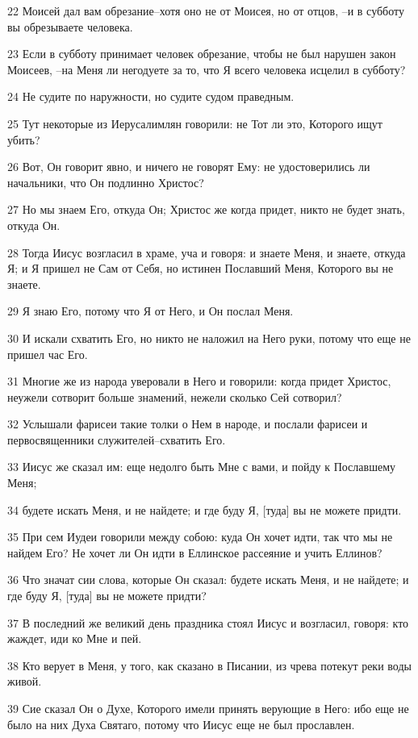 \par 22 Моисей дал вам обрезание--хотя оно не от Моисея, но от отцов, --и в субботу вы обрезываете человека.
\par 23 Если в субботу принимает человек обрезание, чтобы не был нарушен закон Моисеев, --на Меня ли негодуете за то, что Я всего человека исцелил в субботу?
\par 24 Не судите по наружности, но судите судом праведным.
\par 25 Тут некоторые из Иерусалимлян говорили: не Тот ли это, Которого ищут убить?
\par 26 Вот, Он говорит явно, и ничего не говорят Ему: не удостоверились ли начальники, что Он подлинно Христос?
\par 27 Но мы знаем Его, откуда Он; Христос же когда придет, никто не будет знать, откуда Он.
\par 28 Тогда Иисус возгласил в храме, уча и говоря: и знаете Меня, и знаете, откуда Я; и Я пришел не Сам от Себя, но истинен Пославший Меня, Которого вы не знаете.
\par 29 Я знаю Его, потому что Я от Него, и Он послал Меня.
\par 30 И искали схватить Его, но никто не наложил на Него руки, потому что еще не пришел час Его.
\par 31 Многие же из народа уверовали в Него и говорили: когда придет Христос, неужели сотворит больше знамений, нежели сколько Сей сотворил?
\par 32 Услышали фарисеи такие толки о Нем в народе, и послали фарисеи и первосвященники служителей--схватить Его.
\par 33 Иисус же сказал им: еще недолго быть Мне с вами, и пойду к Пославшему Меня;
\par 34 будете искать Меня, и не найдете; и где буду Я, [туда] вы не можете придти.
\par 35 При сем Иудеи говорили между собою: куда Он хочет идти, так что мы не найдем Его? Не хочет ли Он идти в Еллинское рассеяние и учить Еллинов?
\par 36 Что значат сии слова, которые Он сказал: будете искать Меня, и не найдете; и где буду Я, [туда] вы не можете придти?
\par 37 В последний же великий день праздника стоял Иисус и возгласил, говоря: кто жаждет, иди ко Мне и пей.
\par 38 Кто верует в Меня, у того, как сказано в Писании, из чрева потекут реки воды живой.
\par 39 Сие сказал Он о Духе, Которого имели принять верующие в Него: ибо еще не было на них Духа Святаго, потому что Иисус еще не был прославлен.
